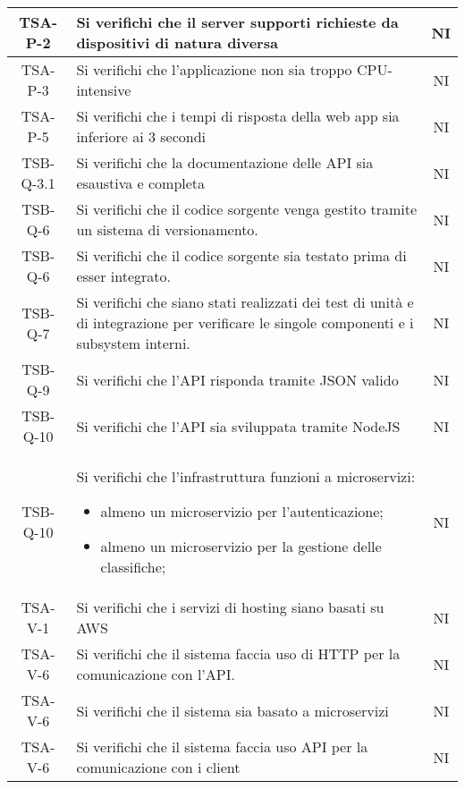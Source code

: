 \begin{center}
\begin{longtable}{|c|p{10cm}|c|}
			 \hline
			 TSA-P-2 & Si verifichi che il server supporti richieste da dispositivi di natura diversa & NI \\
			 \hline
			 TSA-P-3 & Si verifichi che l'applicazione non sia troppo CPU-intensive & NI \\
			 \hline
			 TSA-P-5 & Si verifichi che i tempi di risposta della web app sia inferiore ai 3 secondi & NI \\
			 \hline
			 TSB-Q-3.1 & Si verifichi che la documentazione delle API sia esaustiva e completa & NI \\
			 \hline
			 TSB-Q-6 & Si verifichi che il codice sorgente venga gestito tramite un sistema di versionamento. & NI \\
			 \hline
			 TSB-Q-6 & Si verifichi che il codice sorgente sia testato prima di esser integrato. & NI \\
			 \hline
			 TSB-Q-7 & Si verifichi che siano stati realizzati dei test di unità e di integrazione per verificare le singole componenti e i subsystem interni. & NI \\
			 \hline
			 TSB-Q-9 & Si verifichi che l'API risponda tramite JSON valido & NI \\
			 \hline
			 TSB-Q-10 & Si verifichi che l'API sia sviluppata tramite NodeJS & NI \\
			 \hline
			 TSB-Q-10 & Si verifichi che l'infrastruttura funzioni a microservizi: 
			 \begin{itemize}
			 	\item almeno un microservizio per l'autenticazione;
			 	\item almeno un microservizio per la gestione delle classifiche;
			 \end{itemize}& NI \\
			 \hline
			 TSA-V-1 & Si verifichi che i servizi di hosting siano basati su AWS & NI \\ 
			 \hline
			 TSA-V-6 & Si verifichi che il sistema faccia uso di HTTP per la comunicazione con l'API. & NI \\
			 \hline
			 TSA-V-6 & Si verifichi che il sistema sia basato a microservizi & NI \\
			 \hline
			 TSA-V-6 & Si verifichi che il sistema faccia uso API per la comunicazione con i client & NI \\

\end{longtable}
\end{center}
